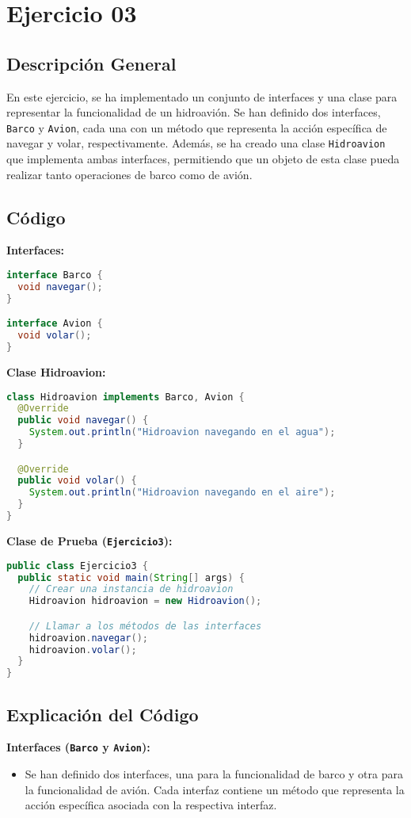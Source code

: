 \section{Ejercicio 03}

\subsection{Descripción General}
En este ejercicio, se ha implementado un conjunto de interfaces y una clase para representar la funcionalidad de un hidroavión. Se han definido dos interfaces, \texttt{Barco} y \texttt{Avion}, cada una con un método que representa la acción específica de navegar y volar, respectivamente. Además, se ha creado una clase \texttt{Hidroavion} que implementa ambas interfaces, permitiendo que un objeto de esta clase pueda realizar tanto operaciones de barco como de avión.

\subsection{Código}
\textbf{Interfaces:}
\begin{lstlisting}[language=Java]
interface Barco {
  void navegar();
}

interface Avion {
  void volar();
}
\end{lstlisting}

\textbf{Clase Hidroavion:}
\begin{lstlisting}[language=Java]
class Hidroavion implements Barco, Avion {
  @Override
  public void navegar() {
    System.out.println("Hidroavion navegando en el agua");
  }

  @Override
  public void volar() {
    System.out.println("Hidroavion navegando en el aire");
  }
}
\end{lstlisting}

\textbf{Clase de Prueba (\texttt{Ejercicio3}):}
\begin{lstlisting}[language=Java]
public class Ejercicio3 {
  public static void main(String[] args) {
    // Crear una instancia de hidroavion
    Hidroavion hidroavion = new Hidroavion();

    // Llamar a los métodos de las interfaces
    hidroavion.navegar();
    hidroavion.volar();
  }
}
\end{lstlisting}

\subsection{Explicación del Código}
\textbf{Interfaces (\texttt{Barco} y \texttt{Avion}):}
\begin{itemize}
  \item Se han definido dos interfaces, una para la funcionalidad de barco y otra para la funcionalidad de avión. Cada interfaz contiene un método que representa la acción específica asociada con la respectiva interfaz.
\end{itemize}

